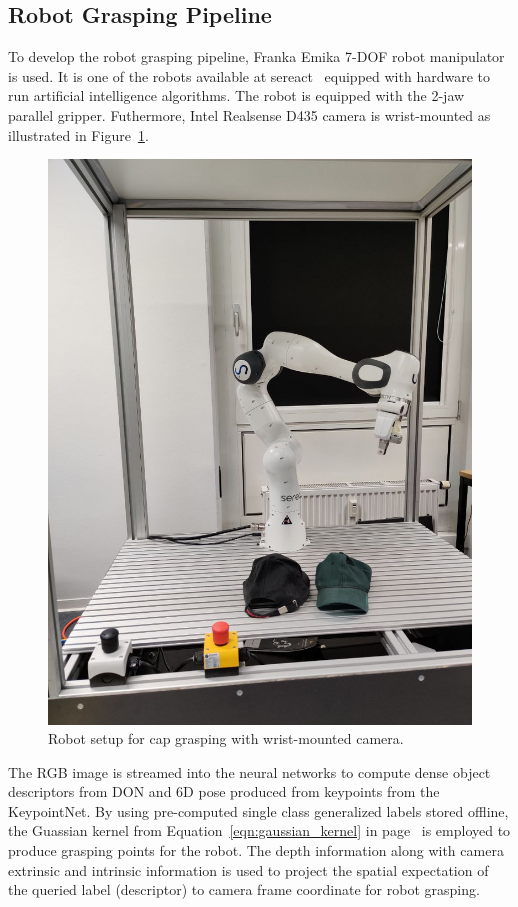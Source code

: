 \subsection{Robot Grasping Pipeline}

To develop the robot grasping pipeline, Franka Emika 7-DOF robot manipulator is used. It is one of the robots available at sereact~\cite{sereact} equipped with hardware to run artificial intelligence algorithms.
The robot is equipped with the 2-jaw parallel gripper. Futhermore, Intel Realsense D435 camera is wrist-mounted as illustrated in Figure~\ref{fig:robot_setup}.\\

\begin{figure}[htb]
    \centering
    \caption{Robot setup for cap grasping with wrist-mounted camera.}
    \label{fig:robot_setup}
    \includegraphics[scale=0.25]{images/robot/setup.jpg}
\end{figure}

The \ac{RGB} image is streamed into the neural networks to compute dense object descriptors from \ac{DON} and 6D pose produced from keypoints from the KeypointNet.
By using pre-computed single class generalized labels stored offline, the Guassian kernel from Equation~\ref{eqn:gaussian_kernel} in page~\pageref{eqn:gaussian_kernel}
is employed to produce grasping points for the robot. The depth information along with camera extrinsic and
intrinsic information is used to project the spatial expectation of the queried label (descriptor) to camera frame coordinate for robot grasping.